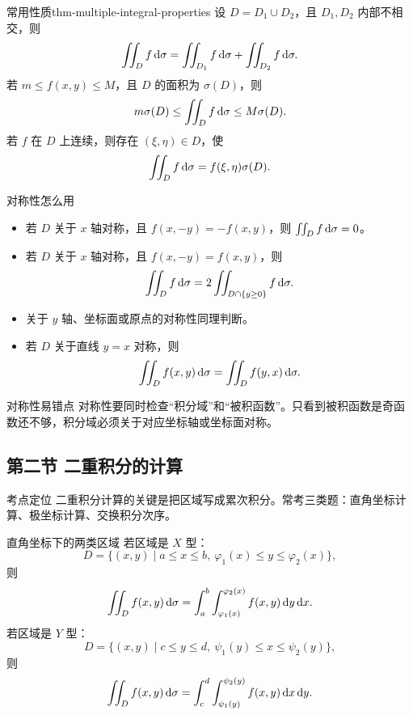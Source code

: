 \begin{dl}{常用性质}{thm-multiple-integral-properties}
设 $D=D_1\cup D_2$，且 $D_1,D_2$ 内部不相交，则
\[
  \iint_D f\mathop{}\!\mathrm{d}\sigma
  =\iint_{D_1} f\mathop{}\!\mathrm{d}\sigma+\iint_{D_2} f\mathop{}\!\mathrm{d}\sigma.
\]
若 $m\le f(x,y)\le M$，且 $D$ 的面积为 $\sigma(D)$，则
\[
  m\sigma(D)\le \iint_D f\mathop{}\!\mathrm{d}\sigma\le M\sigma(D).
\]
若 $f$ 在 $D$ 上连续，则存在 $(\xi,\eta)\in D$，使
\[
  \iint_D f\mathop{}\!\mathrm{d}\sigma=f(\xi,\eta)\sigma(D).
\]
\end{dl}

\begin{methodbox}{对称性怎么用}
\begin{itemize}
  \item 若 $D$ 关于 $x$ 轴对称，且 $f(x,-y)=-f(x,y)$，则 $\iint_D f\mathop{}\!\mathrm{d}\sigma=0$。
  \item 若 $D$ 关于 $x$ 轴对称，且 $f(x,-y)=f(x,y)$，则
  \[
    \iint_D f\mathop{}\!\mathrm{d}\sigma=2\iint_{D\cap\{y\ge0\}} f\mathop{}\!\mathrm{d}\sigma.
  \]
  \item 关于 $y$ 轴、坐标面或原点的对称性同理判断。
  \item 若 $D$ 关于直线 $y=x$ 对称，则
  \[
    \iint_D f(x,y)\mathop{}\!\mathrm{d}\sigma=\iint_D f(y,x)\mathop{}\!\mathrm{d}\sigma.
  \]
\end{itemize}
\end{methodbox}

\begin{warningbox}{对称性易错点}
对称性要同时检查“积分域”和“被积函数”。只看到被积函数是奇函数还不够，积分域必须关于对应坐标轴或坐标面对称。
\end{warningbox}

\subsection{第二节 二重积分的计算}

\begin{summarybox}{考点定位}
二重积分计算的关键是把区域写成累次积分。常考三类题：直角坐标计算、极坐标计算、交换积分次序。
\end{summarybox}

\begin{methodbox}{直角坐标下的两类区域}
若区域是 $X$ 型：
\[
  D=\{(x,y)\mid a\le x\le b,\ \varphi_1(x)\le y\le \varphi_2(x)\},
\]
则
\[
  \iint_D f(x,y)\mathop{}\!\mathrm{d}\sigma
  =\int_a^b\int_{\varphi_1(x)}^{\varphi_2(x)} f(x,y)\mathop{}\!\mathrm{d} y\mathop{}\!\mathrm{d} x.
\]
若区域是 $Y$ 型：
\[
  D=\{(x,y)\mid c\le y\le d,\ \psi_1(y)\le x\le \psi_2(y)\},
\]
则
\[
  \iint_D f(x,y)\mathop{}\!\mathrm{d}\sigma
  =\int_c^d\int_{\psi_1(y)}^{\psi_2(y)} f(x,y)\mathop{}\!\mathrm{d} x\mathop{}\!\mathrm{d} y.
\]
\end{methodbox}

